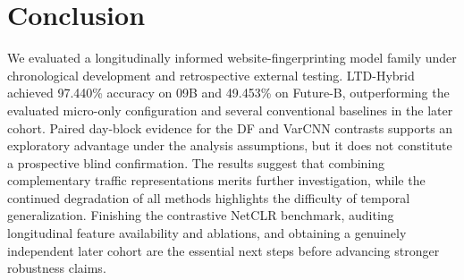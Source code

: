 \section{Conclusion}\label{sec:conclusion}
We evaluated a longitudinally informed website-fingerprinting model family under chronological development and retrospective external testing. LTD-Hybrid achieved 97.440\% accuracy on 09B and 49.453\% on Future-B, outperforming the evaluated micro-only configuration and several conventional baselines in the later cohort. Paired day-block evidence for the DF and VarCNN contrasts supports an exploratory advantage under the analysis assumptions, but it does not constitute a prospective blind confirmation. The results suggest that combining complementary traffic representations merits further investigation, while the continued degradation of all methods highlights the difficulty of temporal generalization. Finishing the contrastive NetCLR benchmark, auditing longitudinal feature availability and ablations, and obtaining a genuinely independent later cohort are the essential next steps before advancing stronger robustness claims.
